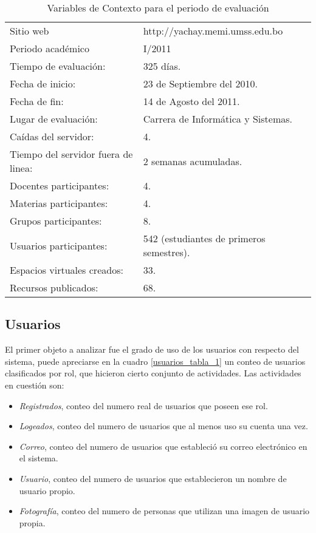 \begin{table}
\centering
\begin{tabular}{l|l}
Sitio web                           & http://yachay.memi.umss.edu.bo\\
Periodo académico                   & I/2011\\
Tiempo de evaluación:               & 325 días.\\
Fecha de inicio:                    & 23 de Septiembre del 2010.\\
Fecha de fin:                       & 14 de Agosto del 2011.\\
Lugar de evaluación:                & Carrera de Informática y Sistemas.\\
Caídas del servidor:                & 4.\\
Tiempo del servidor fuera de linea: & 2 semanas acumuladas.\\
Docentes participantes:             & 4.\\
Materias participantes:             & 4.\\
Grupos participantes:               & 8.\\
Usuarios participantes:             & 542 (estudiantes de primeros semestres).\\
Espacios virtuales creados:         & 33.\\
Recursos publicados:                & 68.\\
\end{tabular}
\caption{Variables de Contexto para el periodo de evaluación}
\label{contexto}
\end{table}

\subsection{Usuarios}
El primer objeto a analizar fue el grado de uso de los usuarios con respecto del
sistema, puede apreciarse en la cuadro \ref{usuarios_tabla_1} un conteo de
usuarios clasificados por rol, que hicieron cierto conjunto de actividades. Las
actividades en cuestión son:

\begin{itemize}
\item \emph{Registrados}, conteo del numero real de usuarios que poseen ese rol.
\item \emph{Logeados}, conteo del numero de usuarios que al menos uso su cuenta
una vez.
\item \emph{Correo}, conteo del numero de usuarios que estableció su correo
electrónico en el sistema.
\item \emph{Usuario}, conteo del numero de usuarios que establecieron un nombre
de usuario propio.
\item \emph{Fotografía}, conteo del numero de personas que utilizan una imagen
de usuario propia.
\end{itemize}


